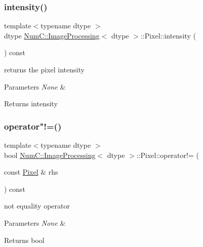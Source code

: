 \subsubsection{\texorpdfstring{intensity()}{intensity()}}
{\footnotesize\ttfamily template$<$typename dtype $>$ \\
dtype \mbox{\hyperlink{class_num_c_1_1_image_processing}{Num\+C\+::\+Image\+Processing}}$<$ dtype $>$\+::Pixel\+::intensity (\begin{DoxyParamCaption}{ }\end{DoxyParamCaption}) const\hspace{0.3cm}{\ttfamily [inline]}}

returns the pixel intensity


\begin{DoxyParams}{Parameters}
{\em None} & \\
\hline
\end{DoxyParams}
\begin{DoxyReturn}{Returns}
intensity 
\end{DoxyReturn}
\mbox{\label{class_num_c_1_1_image_processing_1_1_pixel_a182ba7349c947cbb84535a3d08bbdc1c}} 
\subsubsection{\texorpdfstring{operator"!=()}{operator!=()}}
{\footnotesize\ttfamily template$<$typename dtype $>$ \\
bool \mbox{\hyperlink{class_num_c_1_1_image_processing}{Num\+C\+::\+Image\+Processing}}$<$ dtype $>$\+::Pixel\+::operator!= (\begin{DoxyParamCaption}\item[{const \mbox{\hyperlink{class_num_c_1_1_image_processing_1_1_pixel}{Pixel}} \&}]{rhs }\end{DoxyParamCaption}) const\hspace{0.3cm}{\ttfamily [inline]}}

not equality operator


\begin{DoxyParams}{Parameters}
{\em None} & \\
\hline
\end{DoxyParams}
\begin{DoxyReturn}{Returns}
bool 
\end{DoxyReturn}
\mbox{\label{class_num_c_1_1_image_processing_1_1_pixel_a27f73437f8fa291fcb16c4928cf24a8b}} 
